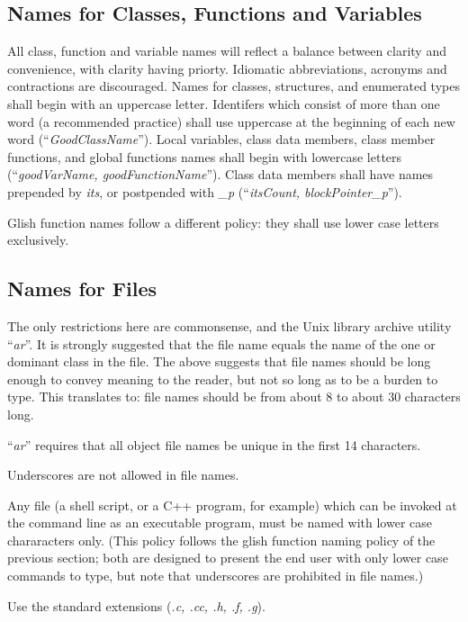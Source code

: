 \subsection {Names for Classes, Functions and Variables}
All class, function and variable names will reflect a balance between
clarity and convenience, with clarity having priorty.  Idiomatic 
abbreviations, acronyms and contractions are discouraged.
Names for classes, structures, and enumerated types shall begin with
an uppercase letter.  Identifers which consist of more than one word
(a recommended practice) shall use uppercase at the beginning of each
new word (``{\em GoodClassName}'').  Local variables, class data members,
class member functions, and global functions names shall begin with
lowercase letters (``{\em goodVarName, goodFunctionName}''). \bmar Class data
members shall have names prepended by {\it its}, or postpended with {\it \_p}
(``{\em itsCount, blockPointer\_p}''). 

 Glish function names follow a different policy: they shall
use lower case letters exclusively.
\subsection {Names for Files} The only restrictions here are
commonsense, and the Unix library archive utility ``{\em ar}''. \bmar It is
strongly suggested that the file name equals the name of the one or dominant
class in the file. The
above suggests that file names should be long enough to convey meaning
to the reader, but not so long as to be a burden to type. This
translates to: file names should be from about 8 to about 30
characters long.

``{\em ar}'' requires that all object file names be unique in the first 14
characters.  

Underscores are not allowed in file names.

Any file (a shell script, or a C++ program, for example) which can be
invoked at the command line as an executable program, must be named
with lower case chararacters only.  (This policy follows the glish function
naming policy of the previous section; both are designed to present the 
end user with only lower case commands to type, but note that underscores
are prohibited in file names.)

Use the standard extensions ({\em .c, .cc, .h, .f, .g}).
